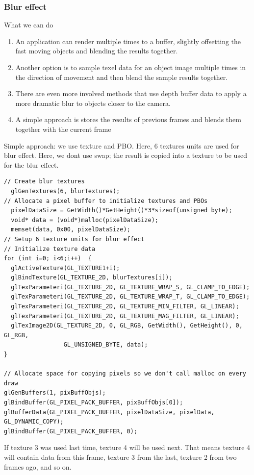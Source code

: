\subsubsection{Blur effect}
\label{sec:blur-effect}

What we can do 
\begin{enumerate}
\item An application can render multiple times to a buffer, slightly
  offsetting the fast moving objects and blending the results
  together. 
\item Another option is to sample texel data for an object image
  multiple times in the direction of movement and then blend the
  sample results together. 
\item There are even more involved methods that use depth buffer data
  to apply a more dramatic blur to objects closer to the camera.  

\item A simple approach is stores the results of previous frames and
  blends them together with the current frame
\end{enumerate}

Simple approach: we use texture and PBO. Here, 6 textures units are
used for blur effect. Here, we dont use swap; the result is copied
into a texture to be used for the blur effect.
\begin{verbatim}
// Create blur textures
  glGenTextures(6, blurTextures);
// Allocate a pixel buffer to initialize textures and PBOs
  pixelDataSize = GetWidth()*GetHeight()*3*sizeof(unsigned byte);
  void* data = (void*)malloc(pixelDataSize);
  memset(data, 0x00, pixelDataSize);
// Setup 6 texture units for blur effect
// Initialize texture data
for (int i=0; i<6;i++)  {
  glActiveTexture(GL_TEXTURE1+i);
  glBindTexture(GL_TEXTURE_2D, blurTextures[i]);
  glTexParameteri(GL_TEXTURE_2D, GL_TEXTURE_WRAP_S, GL_CLAMP_TO_EDGE);
  glTexParameteri(GL_TEXTURE_2D, GL_TEXTURE_WRAP_T, GL_CLAMP_TO_EDGE);
  glTexParameteri(GL_TEXTURE_2D, GL_TEXTURE_MIN_FILTER, GL_LINEAR);
  glTexParameteri(GL_TEXTURE_2D, GL_TEXTURE_MAG_FILTER, GL_LINEAR);
  glTexImage2D(GL_TEXTURE_2D, 0, GL_RGB, GetWidth(), GetHeight(), 0, GL_RGB,
                 GL_UNSIGNED_BYTE, data);
}

// Allocate space for copying pixels so we don't call malloc on every draw
glGenBuffers(1, pixBuffObjs);
glBindBuffer(GL_PIXEL_PACK_BUFFER, pixBuffObjs[0]);
glBufferData(GL_PIXEL_PACK_BUFFER, pixelDataSize, pixelData, GL_DYNAMIC_COPY);
glBindBuffer(GL_PIXEL_PACK_BUFFER, 0);
\end{verbatim}
If texture 3 was used last time, texture 4 will be used next. That
means texture 4 will contain data from this frame, texture 3 from the
last, texture 2 from two frames ago, and so on.

